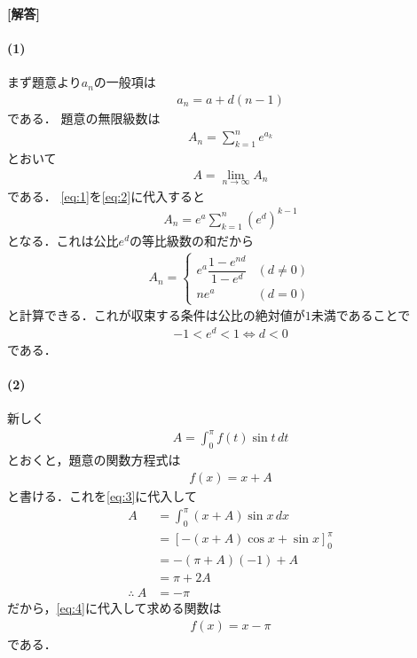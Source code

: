 \documentclass[../../main.tex]{subfiles}
\begin{document}
\begin{oframed}
  
\end{oframed}

{\bf [解答]}
\paragraph{(1)}
まず題意より$a_n$の一般項は
\begin{align}
  a_n = a+d(n-1) \label{eq:1}
\end{align}
である．
題意の無限級数は
\begin{align}
  A_n = \displaystyle\sum_{k=1}^n e^{a_k} \label{eq:2}
\end{align}
とおいて
\begin{align}
  A = \lim_{n\to\infty} A_n
\end{align}
である．
\cref{eq:1}を\cref{eq:2}に代入すると
\begin{align}
  A_n = e^a\sum_{k=1}^n (e^d)^{k-1}
\end{align}
となる．これは公比$e^d$の等比級数の和だから
\begin{align}
  A_n =
  \begin{cases}
    e^a \dfrac{1-e^{nd}}{1-e^d} & (d \neq 0)\\
    ne^a & (d = 0)
  \end{cases}
\end{align}
と計算できる．これが収束する条件は公比の絶対値が$1$未満であることで
\begin{align}
  -1<e^d<1 \iff d< 0
\end{align}
である．

\paragraph{(2)}
新しく
\begin{align}
  A = \displaystyle\int_0^\pi f(t)\sin t\,dt \label{eq:3}
\end{align}
とおくと，題意の関数方程式は
\begin{align}
  f(x)=x+A \label{eq:4}
\end{align}
と書ける．これを\cref{eq:3}に代入して
\begin{align}
  A &= \int_0^\pi (x+A)\sin x\,dx \\
  &= \left[-(x+A)\cos x+\sin x\right]_0^\pi \\
  &= -(\pi+A)(-1)+A \\
  &= \pi+2A \\
  \therefore\
  A &=-\pi
\end{align}
だから，\cref{eq:4}に代入して求める関数は
\begin{align}
  f(x)=x-\pi
\end{align}
である．
\end{document}
